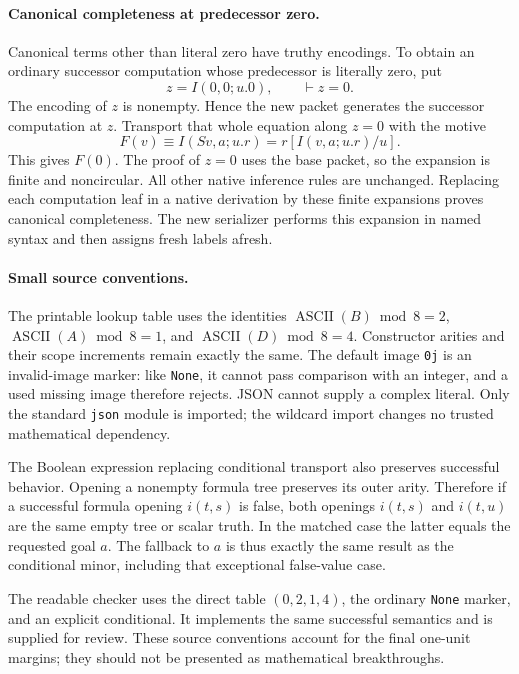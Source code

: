 \paragraph{Canonical completeness at predecessor zero.}
Canonical terms other than literal zero have truthy encodings. To obtain
an ordinary successor computation whose predecessor is literally zero,
put
\[
 z=I(0,0;u.0),\qquad \vdash z=0.
\]
The encoding of $z$ is nonempty. Hence the new packet generates the
successor computation at $z$. Transport that whole equation along $z=0$
with the motive
\[
 F(v)\equiv
 I(Sv,a;u.r)=r[I(v,a;u.r)/u].
\]
This gives $F(0)$. The proof of $z=0$ uses the base packet, so the expansion
is finite and noncircular. All other native inference rules are unchanged.
Replacing each computation leaf in a native derivation by these finite
expansions proves canonical completeness. The new serializer performs
this expansion in named syntax and then assigns fresh labels afresh.

\paragraph{Small source conventions.}
The printable lookup table uses the identities
$\operatorname{ASCII}(B)\bmod8=2$,
$\operatorname{ASCII}(A)\bmod8=1$, and
$\operatorname{ASCII}(D)\bmod8=4$. Constructor arities and their scope
increments remain exactly the same. The default image \texttt{0j} is an
invalid-image marker: like \texttt{None}, it cannot pass comparison with
an integer, and a used missing image therefore rejects. JSON cannot
supply a complex literal. Only the standard \texttt{json} module is
imported; the wildcard import changes no trusted mathematical dependency.

The Boolean expression replacing conditional transport also preserves
successful behavior. Opening a nonempty formula tree preserves its
outer arity. Therefore if a successful formula opening $i(t,s)$ is false,
both openings $i(t,s)$ and $i(t,u)$ are the same empty tree or scalar
truth. In the matched case the latter equals the requested goal $a$.
The fallback to $a$ is thus exactly the same result as the conditional
minor, including that exceptional false-value case.

The readable checker uses the direct table $(0,2,1,4)$, the ordinary
\texttt{None} marker, and an explicit conditional. It implements the
same successful semantics and is supplied for review. These source
conventions account for the final one-unit margins; they should not be
presented as mathematical breakthroughs.
